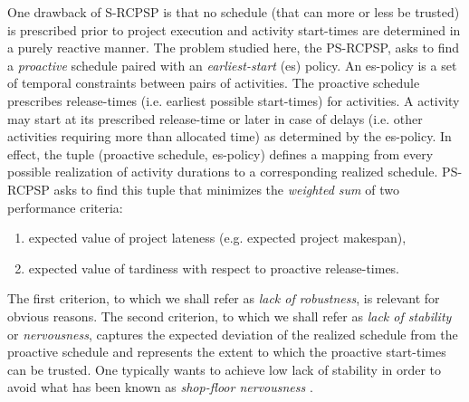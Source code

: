 	One drawback of S-RCPSP is that no schedule 
	(that can more or less be trusted) is prescribed prior to project execution
	and activity start-times are determined in a purely reactive manner.
	The problem studied here, the PS-RCPSP, asks to find
	a \emph{proactive} schedule paired with an \emph{earliest-start} (es) policy.
	An es-policy is a set of temporal constraints between pairs of activities.
	The proactive schedule prescribes release-times (i.e. earliest possible start-times) for activities.
	A activity may start at its prescribed release-time or later in case of delays
	(i.e. other activities requiring more than allocated time) as determined by the es-policy.
	In effect, the tuple (proactive schedule, es-policy) defines a mapping from
	every possible realization of activity durations to a corresponding realized schedule.
	PS-RCPSP asks to find this tuple that minimizes 
	the \emph{weighted sum} of two performance criteria:
	\begin{enumerate}
		\item expected value of project lateness (e.g. expected project makespan),
		\item expected value of tardiness with respect to proactive release-times.
	\end{enumerate}
	The first criterion, to which we shall refer as \emph{lack of robustness}, is relevant for obvious reasons.
	The second criterion, to which we shall refer as \emph{lack of stability} or \emph{nervousness},
	captures the expected deviation of the realized schedule from the proactive schedule
	and represents the extent to which the proactive start-times can be trusted.
 	One typically wants to achieve low lack of stability in order to avoid what has
 	been known as \emph{shop-floor nervousness} \cite{steele1975nervous}.
 	
 	
